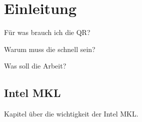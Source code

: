 \chapter{Einleitung}

Für was brauch ich die QR?

Warum muss die schnell sein?

Was soll die Arbeit?

\section{Intel MKL}

Kapitel über die wichtigkeit der Intel MKL.